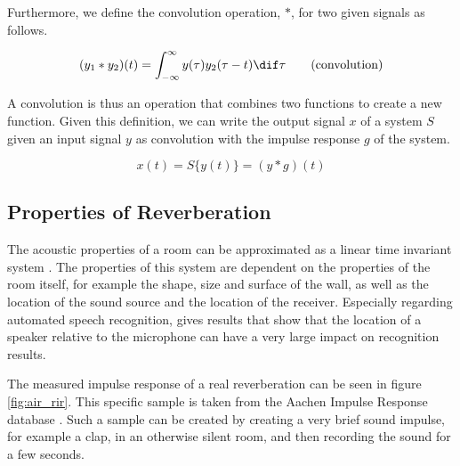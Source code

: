 Furthermore, we define the convolution operation, $*$, for two given signals as follows.

\[
 (y_1 * y_2)(t) = \int_{-\infty}^{\infty} y(\tau)y_2(\tau - t)  \dif\tau \tag{convolution}
\]

A convolution is thus an operation that combines two functions to create a new function. Given this definition, we can write the output signal $x$ of a system $S$ given an input signal $y$ as convolution with the impulse response $g$ of the system. 

\[
x(t) = S\{y(t)\} = (y * g)(t)
\]

\subsection{Properties of Reverberation}

The acoustic properties of a room can be approximated as a linear time invariant system \cite{yoshioka2012making}. The properties of this system are dependent on the properties of the room itself, for example the shape, size and surface of the wall, as well as the location of the sound source and the location of the receiver. Especially regarding automated speech recognition, \cite{ritter2016training} gives results that show that the location of a speaker relative to the microphone can have a very large impact on recognition results.

The measured impulse response of a real reverberation can be seen in figure \ref{fig:air_rir}. This specific sample is taken from the Aachen Impulse Response database \cite{jeub2009binaural}. Such a sample can be created by creating a very brief sound impulse, for example a clap, in an otherwise silent room, and then recording the sound for a few seconds. 

